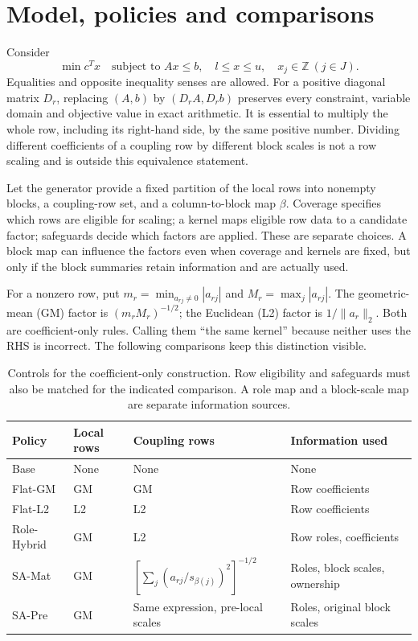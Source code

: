\documentclass[11pt]{article}
\theoremstyle{definition}
\theoremstyle{remark}
\begin{document}


\section{Model, policies and comparisons}
\label{sec:model}
Consider
\[
 \min c^Tx\quad\text{subject to }Ax\le b,\quad l\le x\le u,\quad x_j\in\mathbb Z\ (j\in J).
\]
Equalities and opposite inequality senses are allowed. For a positive diagonal matrix
$D_r$, replacing $(A,b)$ by $(D_rA,D_rb)$ preserves every constraint, variable domain
and objective value in exact arithmetic. It is essential to multiply the whole row,
including its right-hand side, by the same positive number. Dividing different
coefficients of a coupling row by different block scales is not a row scaling and is
outside this equivalence statement.

Let the generator provide a fixed partition of the local rows into nonempty blocks,
a coupling-row set, and a column-to-block map $\beta$. Coverage specifies which rows
are eligible for scaling; a kernel maps eligible row data to a candidate factor;
safeguards decide which factors are applied. These are separate choices. A block map
can influence the factors even when coverage and kernels are fixed, but only if the
block summaries retain information and are actually used.

For a nonzero row, put $m_r=\min_{a_{rj}\ne0}|a_{rj}|$ and
$M_r=\max_j|a_{rj}|$. The geometric-mean (GM) factor is $(m_rM_r)^{-1/2}$;
the Euclidean (L2) factor is $1/\|a_r\|_2$. Both are coefficient-only rules.
Calling them ``the same kernel'' because neither uses the RHS is incorrect.
The following comparisons keep this distinction visible.
\begin{table}[tb]
\centering\small
\caption{Controls for the coefficient-only construction. Row eligibility and safeguards
must also be matched for the indicated comparison. A role map and a block-scale map are
separate information sources.}\label{tab:policies}
\begin{tabularx}{\linewidth}{lXXX}
\toprule
Policy & Local rows & Coupling rows & Information used\\
\midrule
Base & None & None & None\\
Flat-GM & GM & GM & Row coefficients\\
Flat-L2 & L2 & L2 & Row coefficients\\
Role-Hybrid & GM & L2 & Row roles, coefficients\\
SA-Mat & GM & $\left[\sum_j(a_{rj}/s_{\beta(j)})^2\right]^{-1/2}$ & Roles, block scales, ownership\\
SA-Pre & GM & Same expression, pre-local scales & Roles, original block scales\\
\bottomrule
\end{tabularx}
\end{table}
\end{document}
